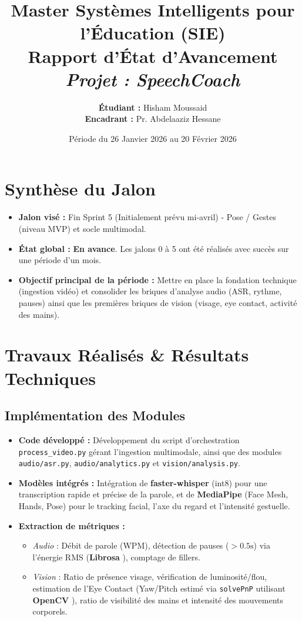 \documentclass[12pt,a4paper]{article}
\title{
    \vspace{-2cm}
    \large Master Systèmes Intelligents pour l'Éducation (SIE)\\
    \vspace{0.5cm}
    \huge \textbf{Rapport d'État d'Avancement}\\
    \large \textit{Projet : SpeechCoach}
}
\author{\textbf{Étudiant :} Hisham Moussaid \\ \textbf{Encadrant :} Pr. Abdelaaziz Hessane}
\date{Période du 26 Janvier 2026 au 20 Février 2026}
\begin{document}
\maketitle

\section{Synthèse du Jalon}
\begin{itemize}
    \item \textbf{Jalon visé :} Fin Sprint 5 (Initialement prévu mi-avril) - Pose / Gestes (niveau MVP) et socle multimodal.
    \item \textbf{État global :} \textbf{En avance}. Les jalons 0 à 5 ont été réalisés avec succès sur une période d'un mois.
    \item \textbf{Objectif principal de la période :} Mettre en place la fondation technique (ingestion vidéo) et consolider les briques d'analyse audio (ASR, rythme, pauses) ainsi que les premières briques de vision (visage, eye contact, activité des mains).
\end{itemize}

\section{Travaux Réalisés \& Résultats Techniques}
\subsection{Implémentation des Modules}
\begin{itemize}
    \item \textbf{Code développé :} Développement du script d'orchestration \texttt{process\_video.py} gérant l'ingestion multimodale, ainsi que des modules \texttt{audio/asr.py}, \texttt{audio/analytics.py} et \texttt{vision/analysis.py}.
    \item \textbf{Modèles intégrés :} Intégration de \textbf{faster-whisper} (int8) \cite{radford2022robust} pour une transcription rapide et précise de la parole, et de \textbf{MediaPipe} (Face Mesh, Hands, Pose) \cite{mediapipe2023} pour le tracking facial, l'axe du regard et l'intensité gestuelle.
    \item \textbf{Extraction de métriques :}
    \begin{itemize}
        \item \textit{Audio} : Débit de parole (WPM), détection de pauses ($>0.5\text{s}$) via l'énergie RMS (\textbf{Librosa} \cite{mcfee2015librosa}), comptage de fillers.
        \item \textit{Vision} : Ratio de présence visage, vérification de luminosité/flou, estimation de l'Eye Contact (Yaw/Pitch estimé via \texttt{solvePnP} utilisant \textbf{OpenCV} \cite{opencv_library}), ratio de visibilité des mains et intensité des mouvements corporels.
    \end{itemize}
\end{itemize}
\end{document}
